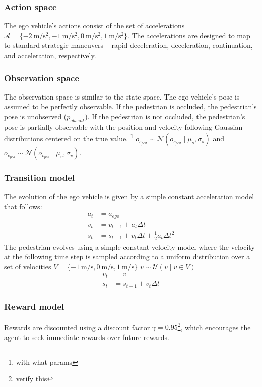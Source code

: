 \documentclass[conference]{IEEEtran}
\begin{document}
\subsubsection{Action space} The ego vehicle's actions consist of the set of accelerations $\mathcal{A} = \{-2~\si{\meter\per\square\second}, -1~\si{\meter\per\square\second}, 0~\si{\meter\per\square\second}, 1~\si{\meter\per\square\second}\}$. The accelerations are designed to map to standard strategic maneuvers -- rapid deceleration, deceleration, continuation, and acceleration, respectively.

\subsubsection{Observation space} The observation space is similar to the state space. The ego vehicle's pose is assumed to be perfectly observable. If the pedestrian is occluded, the pedestrian's pose is unobserved ($p_{absent}$). If the pedestrian is not occluded, the pedestrian's pose is partially observable with the position and velocity following Gaussian distributions centered on the true value. \footnote{with what params} $o_{s_{ped}} \sim \mathcal{N}(o_{s_{ped}} \mid \mu_s, \sigma_s)$ and $o_{v_{ped}} \sim \mathcal{N}(o_{v_{ped}} \mid \mu_v, \sigma_v)$.

\subsubsection{Transition model} The evolution of the ego vehicle is given by a simple constant acceleration model that follows:
\begin{align}
    a_t &= a_{ego} \nonumber \\
    v_t &= v_{t-1} + a_t \Delta t \\
    s_t &= s_{t-1} + v_t \Delta t + \tfrac{1}{2} a_t \Delta t^2 \nonumber
\end{align}
The pedestrian evolves using a simple constant velocity model where the velocity at the following time step is sampled according to a uniform distribution over a set of velocities $V = \{-1~\si{\meter\per\second}, 0~\si{\meter\per\second}, 1~\si{\meter\per\second}\}$ $v \sim \mathcal{U}(v \mid v \in V)$
\begin{align}
    v_t &= v \nonumber \\
    s_t &= s_{t-1} + v_t \Delta t 
\end{align}

\subsubsection{Reward model} Rewards are discounted using a discount factor $\gamma = 0.95$\footnote{verify this}, which encourages the agent to seek immediate rewards over future rewards.  
\end{document}
